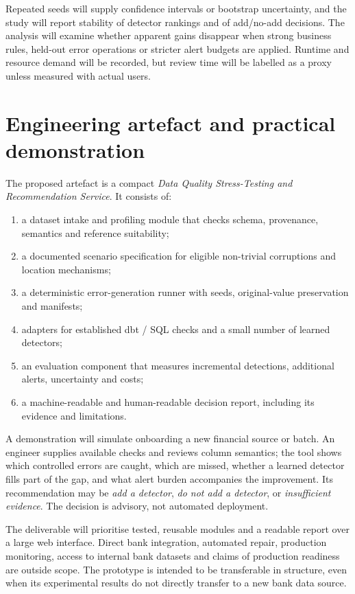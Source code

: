 \documentclass[10pt,a4paper]{article}
\begin{document}
Repeated seeds will supply confidence intervals or bootstrap uncertainty, and the study will report stability of detector rankings and of add/no-add decisions. The analysis will examine whether apparent gains disappear when strong business rules, held-out error operations or stricter alert budgets are applied. Runtime and resource demand will be recorded, but review time will be labelled as a proxy unless measured with actual users.

\section{Engineering artefact and practical demonstration}
The proposed artefact is a compact \emph{Data Quality Stress-Testing and Recommendation Service}. It consists of:
\begin{enumerate}
\item a dataset intake and profiling module that checks schema, provenance, semantics and reference suitability;
\item a documented scenario specification for eligible non-trivial corruptions and location mechanisms;
\item a deterministic error-generation runner with seeds, original-value preservation and manifests;
\item adapters for established dbt / SQL checks and a small number of learned detectors;
\item an evaluation component that measures incremental detections, additional alerts, uncertainty and costs;
\item a machine-readable and human-readable decision report, including its evidence and limitations.
\end{enumerate}

A demonstration will simulate onboarding a new financial source or batch. An engineer supplies available checks and reviews column semantics; the tool shows which controlled errors are caught, which are missed, whether a learned detector fills part of the gap, and what alert burden accompanies the improvement. Its recommendation may be \emph{add a detector}, \emph{do not add a detector}, or \emph{insufficient evidence}. The decision is advisory, not automated deployment.

The deliverable will prioritise tested, reusable modules and a readable report over a large web interface. Direct bank integration, automated repair, production monitoring, access to internal bank datasets and claims of production readiness are outside scope. The prototype is intended to be transferable in structure, even when its experimental results do not directly transfer to a new bank data source.
\end{document}
